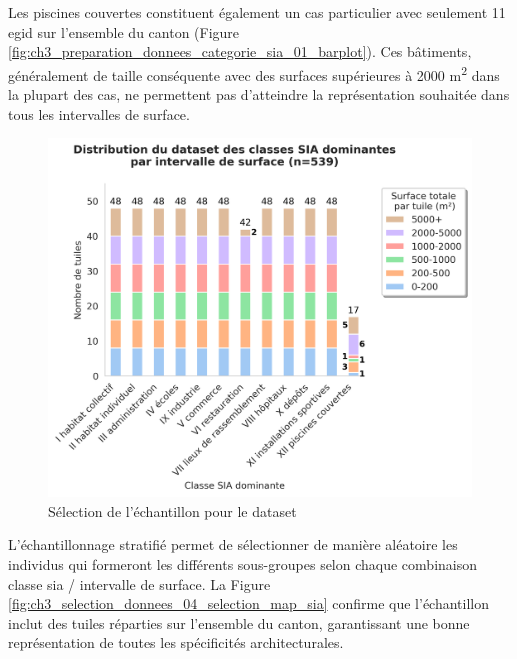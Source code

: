 Les piscines couvertes constituent également un cas particulier avec seulement 11 \gls{egid} sur l'ensemble du canton (Figure \ref{fig:ch3_preparation_donnees_categorie_sia_01_barplot}). Ces bâtiments, généralement de taille conséquente avec des surfaces supérieures à 2000 \si{\unit{\square\meter}} dans la plupart des cas, ne permettent pas d'atteindre la représentation souhaitée dans tous les intervalles de surface.

\begin{figure}[H]
    \centering
    \includegraphics[width=1\linewidth]{02-main/figures/ch3/ch3_selection_donnees_03_selection_stacked.png}
    \caption{Sélection de l'échantillon pour le dataset}
    \label{fig:ch3_selection_donnees_03_selection_stacked}
\end{figure}

L'échantillonnage stratifié permet de sélectionner de manière aléatoire les individus qui formeront les différents sous-groupes selon chaque combinaison classe \gls{sia} / intervalle de surface. La Figure \ref{fig:ch3_selection_donnees_04_selection_map_sia} confirme que l'échantillon inclut des tuiles réparties sur l'ensemble du canton, garantissant une bonne représentation de toutes les spécificités architecturales.

